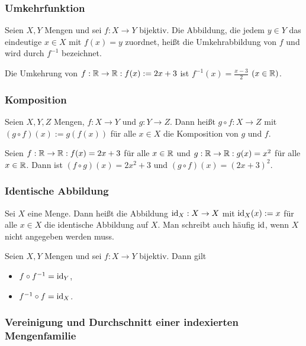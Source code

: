 \subsubsection{Umkehrfunktion}

Seien $ X,Y $ Mengen und sei $ f : X \to Y $ bijektiv. Die Abbildung, die jedem $ y \in Y $ das eindeutige $ x \in X $ mit $ f(x) = y $ zuordnet, heißt die Umkehrabbildung von $ f $ und wird durch $ f^{-1} $ bezeichnet.

\begin{bsp}
	Die Umkehrung von $ f : \mathbb R \to \mathbb R : f(x) := 2x + 3 $ ist $ f^{-1}(x) = \frac{x-3}{2} $ $ ( x \in \mathbb R ) $.
\end{bsp}

\subsubsection{Komposition}

Seien $ X,Y,Z $ Mengen, $ f : X \to Y $ und $ g : Y \to Z $. Dann heißt $ g \circ f : X \to Z $ mit $ ( g \circ f )(x) := g( f(x) ) $ für alle $ x \in X $ die Komposition von $ g $ und $ f $.

\begin{bsp}
	Seien $ f : \mathbb R \to \mathbb R : f(x) = 2x + 3 $ für alle $ x \in \mathbb R $ und $ g : \mathbb R \to \mathbb R : g(x) = x^2 $ für alle $ x \in \mathbb R $. Dann ist $ ( f \circ g )(x) = 2x^2 + 3 $ und $ ( g \circ f )(x) = (2x + 3)^2 $.
\end{bsp}

\subsubsection{Identische Abbildung}

Sei $ X $ eine Menge. Dann heißt die Abbildung $ \operatorname{id}_X : X \to X $ mit $ \operatorname{id}_X(x) := x $ für alle $ x \in X $ die identische Abbildung auf $ X $. Man schreibt auch häufig $ \operatorname{id} $, wenn $ X $ nicht angegeben werden muss.

\begin{bem}
	Seien $ X,Y $ Mengen und sei $ f : X \to Y $ bijektiv. Dann gilt
	\begin{itemize}
		\item $ f \circ f^{-1} = \operatorname{id}_Y $,
		\item $ f^{-1} \circ f = \operatorname{id}_X $.
	\end{itemize}
\end{bem} 

\subsubsection{Vereinigung und Durchschnitt einer indexierten Mengenfamilie}

